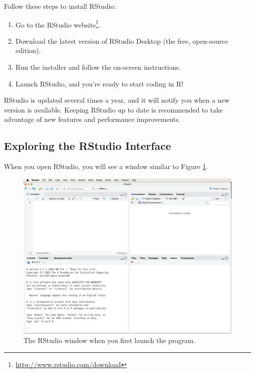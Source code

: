 \documentclass[
  11pt,
]{book}
\providecommand{\tightlist}{%
  \setlength{\itemsep}{0pt}\setlength{\parskip}{0pt}}
\renewcommand{\href}[2]{#2\footnote{\url{#1}}}
\theoremstyle{definition}
\theoremstyle{definition}
\theoremstyle{definition}
\theoremstyle{definition}
\theoremstyle{remark}
\begin{document}
Follow these steps to install RStudio:

\begin{enumerate}
\def\labelenumi{\arabic{enumi}.}
\tightlist
\item
  Go to the \href{http://www.rstudio.com/download}{RStudio website}.\\
\item
  Download the latest version of RStudio Desktop (the free, open-source edition).\\
\item
  Run the installer and follow the on-screen instructions.\\
\item
  Launch RStudio, and you're ready to start coding in R!
\end{enumerate}

RStudio is updated several times a year, and it will notify you when a new version is available. Keeping RStudio up to date is recommended to take advantage of new features and performance improvements.

\subsection*{Exploring the RStudio Interface}\label{exploring-the-rstudio-interface}


When you open RStudio, you will see a window similar to Figure \ref{fig:RStudio-window-1}.

\begin{figure}[H]

{\centering \includegraphics[width=0.7\linewidth]{images/ch1_RStudio-window-1} 

}

\caption{The RStudio window when you first launch the program.}\label{fig:RStudio-window-1}
\end{figure}
\end{document}
